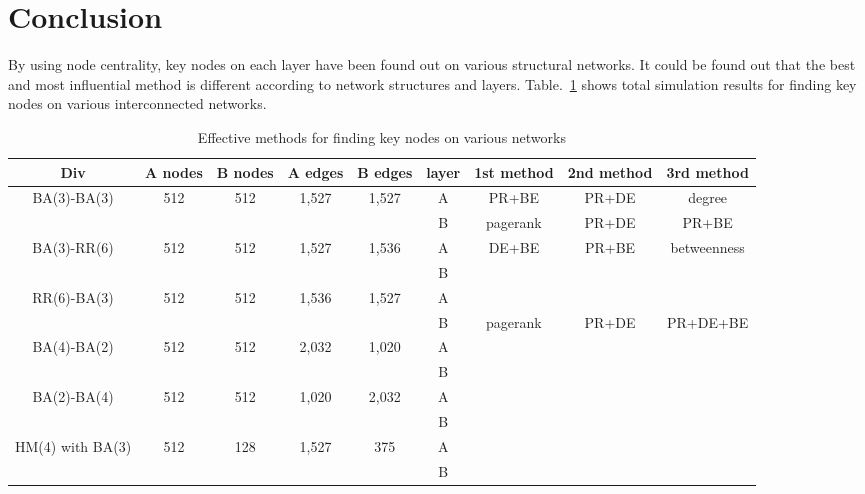 \section{Conclusion}
By using node centrality, key nodes on each layer have been found out on various structural networks. It could be found out that the best and most influential method is different according to network structures and layers. Table.~\ref{effective methods} shows total simulation results for finding key nodes on various interconnected networks. 
\begin{table}[!htb]
	\scriptsize
	\centering
	\caption{Effective methods for finding key nodes on various networks}
	\label{effective methods}
	\begin{center}
		\begin{tabular}{c|c|c|c|c|c|c|c|c} \hline\hline
		  Div                              & A nodes & B nodes & A edges & B edges & layer & 1st method & 2nd method  & 3rd method  \\ \hline \hline
         \multirow{1}{*}{BA(3)-BA(3)}      & 512 	 & 512     & 1,527   & 1,527   & A     & PR+BE      & PR+DE       & degree      \\ 
			                               &  	     &         &         &         & B     & pagerank   & PR+DE       & PR+BE       \\ \hline   
	     \multirow{1}{*}{BA(3)-RR(6)}      & 512     & 512     & 1,527   & 1,536   & A     & DE+BE      & PR+BE       & betweenness \\
	                                       &         &         &         &         & B     &            &             &             \\ \hline
	     \multirow{1}{*}{RR(6)-BA(3)}      & 512     & 512     & 1,536   & 1,527   & A     &            &             &             \\ 
	                                       &         &         &         &         & B     & pagerank   & PR+DE       & PR+DE+BE    \\ \hline
	   
		 \multirow{1}{*}{BA(4)-BA(2)}      & 512     & 512     & 2,032   & 1,020   & A     &            &             &             \\ 
		                                   &         &         &         &         & B     &            &             &             \\ \hline
		 \multirow{1}{*}{BA(2)-BA(4)}      & 512     & 512     & 1,020   & 2,032   & A     &            &             &             \\ 
		                                   &         &         &         &         & B     &            &             &             \\ \hline
		 \multirow{1}{*}{HM(4) with BA(3)} & 512     & 128     & 1,527   & 375     & A     &            &             &             \\ 
		                                   &         &         &         &         & B     &            &             &             \\ \hline
			\hline
		\end{tabular}
	\end{center}
\end{table}





